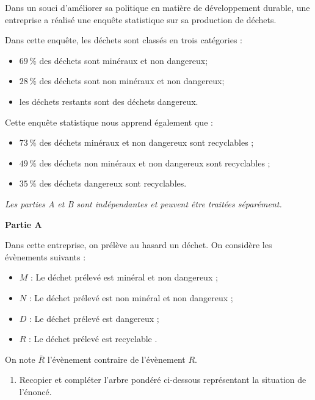\medskip

Dans un souci d'améliorer sa politique en matière de développement durable, une entreprise a réalisé une enquête statistique sur sa production de déchets.

Dans cette enquête, les déchets sont classés en trois catégories :

\begin{itemize}
\item $69\,\%$ des déchets sont minéraux et non dangereux;
\item $28\,\%$ des déchets sont non minéraux et non dangereux;
\item les déchets restants sont des déchets dangereux.
\end{itemize}

Cette enquête statistique nous apprend également que :

\begin{itemize}
\item $73\,\%$ des déchets minéraux et non dangereux sont recyclables ;
\item $49\,\%$ des déchets non minéraux et non dangereux sont recyclables ;
\item $35\,\%$ des déchets dangereux sont recyclables.
\end{itemize}

\emph{Les parties {\rm A} et {\rm B} sont indépendantes et peuvent être traitées séparément.}

\medskip

\textbf{Partie A}

\medskip

Dans cette entreprise, on prélève au hasard un déchet. On considère les évènements suivants :

\begin{itemize}
\item $M$ : \og Le déchet prélevé est minéral et non dangereux \fg{} ;
\item $N$ : \og Le déchet prélevé est non minéral et non dangereux \fg{};
\item $D$ : \og Le déchet prélevé est dangereux \fg{};
\item $R$ : \og Le déchet prélevé est recyclable \fg.
\end{itemize}

On note $\overline{R}$ l'évènement contraire de l'évènement $R$.

\begin{enumerate}
\item Recopier et compléter l'arbre pondéré ci-dessous représentant la situation de l'énoncé.
\end{enumerate}


